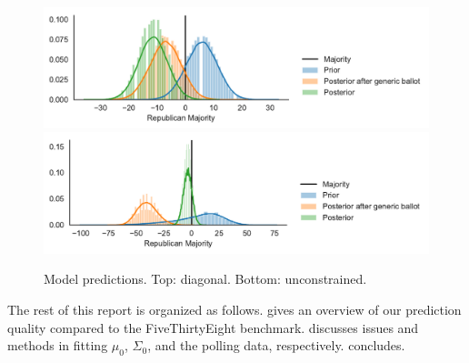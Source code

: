 \documentclass[12pt]{article}
\begin{document}
\begin{figure}[tb]
  \centering
  \includegraphics[width=.7\textwidth]{rep_seats_with_diagonal_prior.pdf}
  \includegraphics[width=.7\textwidth]{rep_seats.pdf}
  \caption{Model predictions. Top: diagonal. Bottom: unconstrained. }
  \label{fig:model}
\end{figure}

The rest of this report is organized as follows.  gives an overview of our prediction quality compared to the FiveThirtyEight benchmark.  discusses issues and methods in fitting $\mu_0$, $\Sigma_0$, and the polling data, respectively.  concludes.
\end{document}
